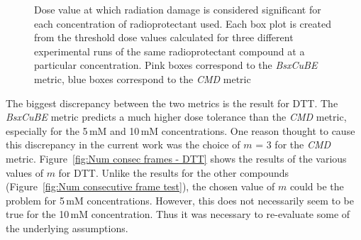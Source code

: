 \begin{figure}
\begin{subfigure}[b]{0.72\textwidth}
            \caption{}
            \label{fig:SAXS Metric comparison - 10mM}
    \end{subfigure}
    \caption[Radioprotectant efficacy comparison  boxplots for each concentration in the experiment.]{Dose value at which radiation damage is considered significant for each concentration of radioprotectant used. Each box plot is created from the threshold dose values calculated for three different experimental runs of the same radioprotectant compound at a particular concentration. Pink boxes correspond to the \textit{BsxCuBE} metric, blue boxes correspond to the \textit{CMD} metric}
    \label{fig:SAXS Metric comparison}
\end{figure}

The biggest discrepancy between the two metrics is the result for DTT.
The \textit{BsxCuBE} metric predicts a much higher dose tolerance than the \textit{CMD} metric, especially for the 5$\,$mM and 10$\,$mM concentrations.
One reason thought to cause this discrepancy in the current work was the choice of $m$ = 3 for the \textit{CMD} metric.
Figure~\ref{fig:Num consec frames - DTT} shows the results of the various values of $m$ for DTT.
Unlike the results for the other compounds (Figure~\ref{fig:Num consecutive frame test}), the chosen value of $m$ could be the problem for 5$\,$mM concentrations.
However, this does not necessarily seem to be true for the 10$\,$mM concentration.
Thus it was necessary to re-evaluate some of the underlying assumptions.


